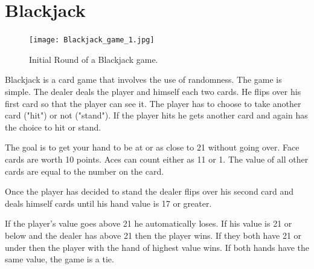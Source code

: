 \section*{Blackjack}
\begin{figure}
\texttt{[image: Blackjack\_game\_1.jpg]}
\caption{Initial Round of a Blackjack game.}
\end{figure}

Blackjack is a card game that involves the use of randomness.
The game is simple.
The dealer deals the player and himself each two cards.
He flips over his first card so that the player can see it.
The player has to choose to take another card ("hit") or not ("stand").
If the player hits he gets another card and again has the choice to hit or stand.

The goal is to get your hand to be at or as close to 21 without going over.
Face cards are worth 10 points.
Aces can count either as 11 or 1.
The value of all other cards are equal to the number on the card.

Once the player has decided to stand the dealer flips over his second card and deals himself cards until his hand value is 17 or greater. 

If the player's value goes above 21 he automatically loses.
If his value is 21 or below and the dealer has above 21 then the player wins.
If they both have 21 or under then the player with the hand of highest value wins.
If both hands have the same value, the game is a tie.

